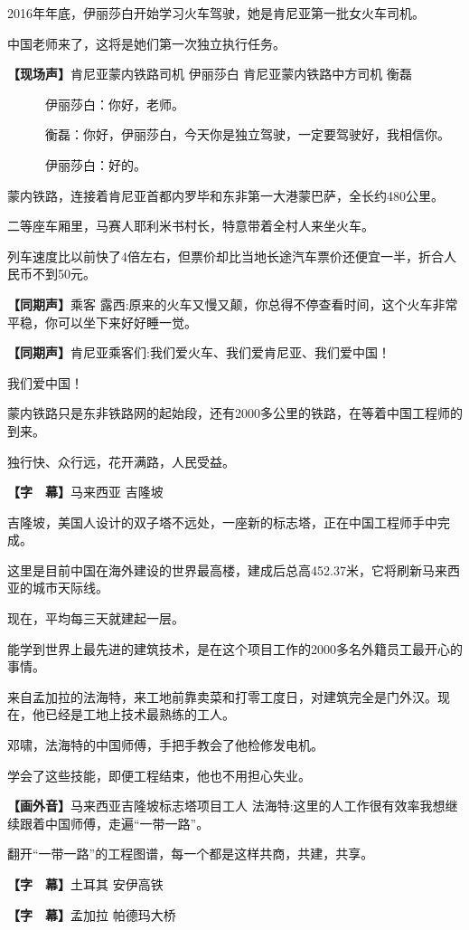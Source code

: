 \documentclass{ctexart}
\newcommand{\zkh}[1]{\textbf{\hspace{-2.7em} 【#1】}}
\begin{document}
2016年年底，伊丽莎白开始学习火车驾驶，她是肯尼亚第一批女火车司机。

中国老师来了，这将是她们第一次独立执行任务。

\zkh{现场声}肯尼亚蒙内铁路司机 伊丽莎白 肯尼亚蒙内铁路中方司机 衡磊

　　　伊丽莎白：你好，老师。

　　　衡磊：你好，伊丽莎白，今天你是独立驾驶，一定要驾驶好，我相信你。

　　　伊丽莎白：好的。

蒙内铁路，连接着肯尼亚首都内罗毕和东非第一大港蒙巴萨，全长约480公里。

二等座车厢里，马赛人耶利米书村长，特意带着全村人来坐火车。

列车速度比以前快了4倍左右，但票价却比当地长途汽车票价还便宜一半，折合人民币不到50元。

\zkh{同期声}乘客 露西:原来的火车又慢又颠，你总得不停查看时间，这个火车非常平稳，你可以坐下来好好睡一觉。

\zkh{同期声}肯尼亚乘客们:我们爱火车、我们爱肯尼亚、我们爱中国！

我们爱中国！

蒙内铁路只是东非铁路网的起始段，还有2000多公里的铁路，在等着中国工程师的到来。

独行快、众行远，花开满路，人民受益。

\zkh{字　幕}马来西亚 吉隆坡

吉隆坡，美国人设计的双子塔不远处，一座新的标志塔，正在中国工程师手中完成。

这里是目前中国在海外建设的世界最高楼，建成后总高452.37米，它将刷新马来西亚的城市天际线。

现在，平均每三天就建起一层。

能学到世界上最先进的建筑技术，是在这个项目工作的2000多名外籍员工最开心的事情。

来自孟加拉的法海特，来工地前靠卖菜和打零工度日，对建筑完全是门外汉。现在，他已经是工地上技术最熟练的工人。

邓啸，法海特的中国师傅，手把手教会了他检修发电机。

学会了这些技能，即便工程结束，他也不用担心失业。

\zkh{画外音}马来西亚吉隆坡标志塔项目工人 法海特:这里的人工作很有效率我想继续跟着中国师傅，走遍``一带一路''。

翻开``一带一路''的工程图谱，每一个都是这样共商，共建，共享。

\zkh{字　幕}土耳其 安伊高铁

\zkh{字　幕}孟加拉 帕德玛大桥
\end{document}
